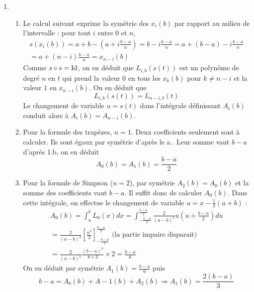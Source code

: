 \begin{enumerate}
\item \begin{enumerate}
 \item Le calcul suivant exprime la symétrie des $x_i(b)$ par rapport au milieu de l'intervalle : pour tout $i$ entre $0$ et $n$, 
\begin{multline*}
 s(x_i(b))=a+b-\left( a+i\frac{b-a}{n}\right) = b-i\frac{b-a}{n} 
= a+ (b-a) - i\frac{b-a}{n}\\
=a+(n-i)\frac{b-a}{n} = x_{n-i}(b)
\end{multline*}
Comme $s\circ s=\operatorname{Id}$, on en déduit que $L_{i,b}(s(t))$ est un polynôme de degré $n$ en $t$ qui prend la valeur $0$ en tous les $x_k(b)$ pour $k\neq n-i$ et la valeur $1$ en $x_{n-i}(b)$. On en déduit que 
\begin{displaymath}
 L_{i,b}(s(t)) = L_{n-i,b}(t)
\end{displaymath}
Le changement de variable $u=s(t)$ dans l'intégrale définissant $A_i(b)$ conduit alors à $A_i(b)=A_{n-i}(b)$.
\item Pour la formule des trapèzes, $n=1$. Deux coefficients seulement sont à calculer. Ils sont égaux par symétrie d'après le a.. Leur somme vaut $b-a$ d'après 1.b, on en déduit
\begin{displaymath}
 A_0(b)=A_1(b)=\frac{b-a}{2}
\end{displaymath}
\item Pour la formule de Simpson ($n=2$), par symétrie $A_2(b)=A_0(b)$ et la somme des coefficients vaut $b-a$. Il suffit donc de calculer $A_0(b)$. Dans cette intégrale, on effectue le changement de variable $u=x-\frac{1}{2}(a+b)$ :
\begin{multline*}
 A_0(b) = \int_a^b L_0(x)dx
= \int_{-\frac{b-a}{2}}^{\frac{b-a}{2}}\frac{2}{(a-b)^2}u\left( u+\frac{b-a}{2}\right)du \\
= \frac{2}{(a-b)^2}\left[ \frac{u^3}{3}\right]_{-\frac{b-a}{2}}^{\frac{b-a}{2}}  \text{ (la partie impaire disparait)} \\
= \frac{2}{(a-b)^2}\frac{(b-a)^3}{8\times 3}\times 2 = \frac{b-a}{6}
\end{multline*}
On en déduit par symétrie $A_1(b)=\frac{b-a}{6}$ puis
\begin{displaymath}
 b-a = A_0(b)+A-1(b)+A_2(b) \Rightarrow A_1(b)=\frac{2(b-a)}{3}
\end{displaymath}


\end{enumerate}
\end{enumerate}
